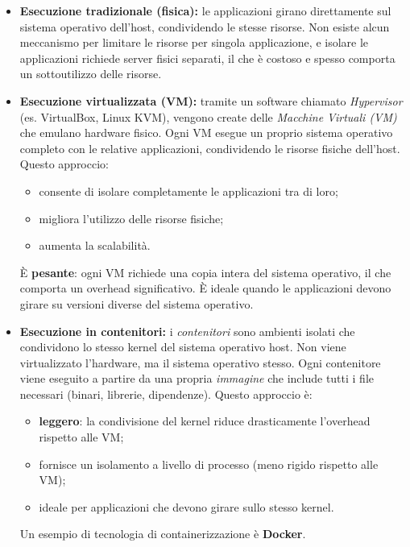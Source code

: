 \documentclass{article}
\begin{document}
\begin{itemize}
    \item \textbf{Esecuzione tradizionale (fisica):} le applicazioni girano direttamente sul sistema operativo dell'host, condividendo le stesse risorse. Non esiste alcun meccanismo per limitare le risorse per singola applicazione, e isolare le applicazioni richiede server fisici separati, il che è costoso e spesso comporta un sottoutilizzo delle risorse.

    \item \textbf{Esecuzione virtualizzata (VM):} tramite un software chiamato \textit{Hypervisor} (es. VirtualBox, Linux KVM), vengono create delle \textit{Macchine Virtuali (VM)} che emulano hardware fisico. Ogni VM esegue un proprio sistema operativo completo con le relative applicazioni, condividendo le risorse fisiche dell'host. Questo approccio:
    \begin{itemize}
        \item consente di isolare completamente le applicazioni tra di loro;
        \item migliora l'utilizzo delle risorse fisiche;
        \item aumenta la scalabilità.
    \end{itemize}
    È \textbf{pesante}: ogni VM richiede una copia intera del sistema operativo, il che comporta un overhead significativo. È ideale quando le applicazioni devono girare su versioni diverse del sistema operativo.

    \item \textbf{Esecuzione in contenitori:} i \textit{contenitori} sono ambienti isolati che condividono lo stesso kernel del sistema operativo host. Non viene virtualizzato l'hardware, ma il sistema operativo stesso. Ogni contenitore viene eseguito a partire da una propria \textit{immagine} che include tutti i file necessari (binari, librerie, dipendenze). Questo approccio è:
    \begin{itemize}
        \item \textbf{leggero}: la condivisione del kernel riduce drasticamente l'overhead rispetto alle VM;
        \item fornisce un isolamento a livello di processo (meno rigido rispetto alle VM);
        \item ideale per applicazioni che devono girare sullo stesso kernel.
    \end{itemize}
    Un esempio di tecnologia di containerizzazione è \textbf{Docker}.
\end{itemize}
\end{document}
